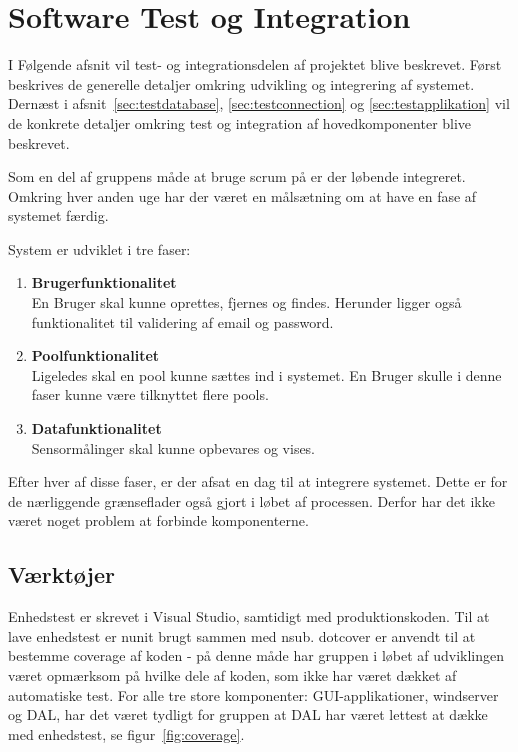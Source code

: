 \chapter{Software Test og Integration}

I Følgende afsnit vil test- og integrationsdelen af projektet blive beskrevet. Først beskrives de generelle detaljer omkring udvikling og integrering af systemet. 
Dernæst i afsnit~\ref{sec:testdatabase}, \ref{sec:testconnection} og \ref{sec:testapplikation} vil de konkrete detaljer omkring test og integration af hovedkomponenter blive beskrevet.

Som en del af gruppens måde at bruge scrum på er der løbende integreret. Omkring hver anden uge har der været en målsætning om at have en fase af systemet færdig. 

System er udviklet i tre faser: 

\begin{enumerate}
	\item \textbf{Brugerfunktionalitet}\\
	En Bruger skal kunne oprettes, fjernes og findes. Herunder ligger også funktionalitet til validering af email og password. 
	\item \textbf{Poolfunktionalitet}\\
	Ligeledes skal en pool kunne sættes ind i systemet. En Bruger skulle i denne faser kunne være tilknyttet flere pools.
	\item \textbf{Datafunktionalitet}\\
	Sensormålinger skal kunne opbevares og vises. 
\end{enumerate}

Efter hver af disse faser, er der afsat en dag til at integrere systemet. Dette er for de nærliggende grænseflader også gjort i løbet af processen. Derfor har det ikke været noget problem at forbinde komponenterne. 

\section{Værktøjer}
Enhedstest er skrevet i Visual Studio, samtidigt med produktionskoden. Til at lave enhedstest er \gls{nunit} brugt sammen med \gls{nsub}. 
\gls{dotcover} er anvendt til at bestemme coverage af koden - på denne måde har gruppen i løbet af udviklingen været opmærksom på hvilke dele af koden, som ikke har været dækket af automatiske test.
For alle tre store komponenter: GUI-applikationer, \gls{windserver} og DAL, har det været tydligt for gruppen at DAL har været lettest at dække med enhedstest, se figur~\ref{fig:coverage}.


